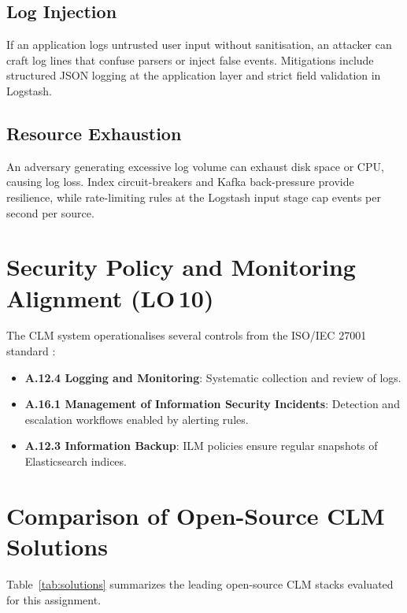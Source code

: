 \documentclass[12pt,a4paper]{report}
\begin{document}
\subsection{Log Injection}

If an application logs untrusted user input without sanitisation, an attacker can craft
log lines that confuse parsers or inject false events.
Mitigations include structured JSON logging at the application layer and strict field
validation in Logstash.

\subsection{Resource Exhaustion}

An adversary generating excessive log volume can exhaust disk space or CPU, causing log
loss.
Index circuit-breakers and Kafka back-pressure provide resilience, while rate-limiting
rules at the Logstash input stage cap events per second per source.

\section{Security Policy and Monitoring Alignment (LO\,10)}

The CLM system operationalises several controls from the ISO/IEC 27001 standard \cite{iso27001}:
\begin{itemize}[leftmargin=1.5em]
    \item \textbf{A.12.4 Logging and Monitoring}: Systematic collection and review of logs.
    \item \textbf{A.16.1 Management of Information Security Incidents}: Detection and
          escalation workflows enabled by alerting rules.
    \item \textbf{A.12.3 Information Backup}: ILM policies ensure regular snapshots of
          Elasticsearch indices.
\end{itemize}


\section{Comparison of Open-Source CLM Solutions}

Table~\ref{tab:solutions} summarizes the leading open-source CLM stacks evaluated for
this assignment.
\end{document}
